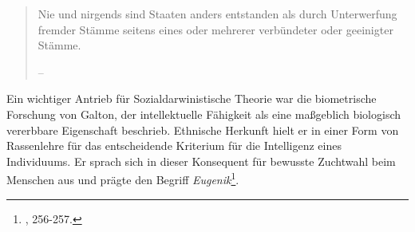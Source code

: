 \documentclass[openany,twoside,twocolumn]{book}
\let\rmarkdownfootnote\footnote%
\def\footnote{\protect\rmarkdownfootnote}
\begin{document}
\begin{quote}
Nie und nirgends sind Staaten anders entstanden als durch Unterwerfung
fremder Stämme seitens eines oder mehrerer verbündeter oder geeinigter
Stämme.

-- \autocite{GumplowiczGrundrissSoziologie1885}
\end{quote}

Ein wichtiger Antrieb für Sozialdarwinistische Theorie war die
biometrische Forschung von Galton, der intellektuelle Fähigkeit als eine
maßgeblich biologisch vererbbare Eigenschaft beschrieb. Ethnische
Herkunft hielt er in einer Form von Rassenlehre für das entscheidende
Kriterium für die Intelligenz eines Individuums. Er sprach sich in
dieser Konsequent für bewusste Zuchtwahl beim Menschen aus und prägte
den Begriff \emph{Eugenik}\footnote{\textcite{bowler_evolution_1989},
  256-257.}.
\end{document}
